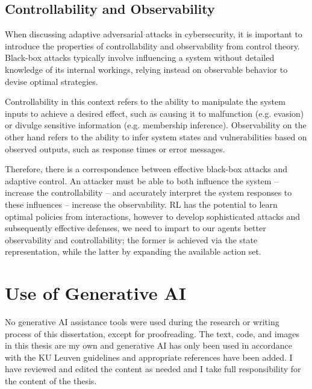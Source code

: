 \subsection{Controllability and Observability}
\label{sec:control}

When discussing adaptive adversarial attacks in cybersecurity, it is important to introduce the properties of controllability and observability from control theory.
Black-box attacks typically involve influencing a system without detailed knowledge of its internal workings, relying instead on observable behavior to devise optimal strategies.

Controllability in this context refers to the ability to manipulate the system inputs to achieve a desired effect, such as causing it to malfunction (e.g. evasion) or divulge sensitive information (e.g. membership inference).
Observability on the other hand refers to the ability to infer system states and vulnerabilities based on observed outputs, such as response times or error messages.

Therefore, there is a correspondence between effective black-box attacks and adaptive control.
An attacker must be able to both influence the system -- increase the controllability -- and accurately interpret the system responses to these influences -- increase the observability.
\gls{RL} has the potential to learn optimal policies from interactions, however to develop sophisticated attacks and subsequently effective defenses, we need to impart to our agents better observability and controllability; the former is achieved via the state representation, while the latter by expanding the available action set.

\section{Use of Generative AI}

No generative AI assistance tools were used during the research or writing process of this dissertation, except for proofreading.
The text, code, and images in this thesis are my own and generative AI has only been used in accordance with the KU Leuven guidelines and appropriate references have been added.
I have reviewed and edited the content as needed and I take full responsibility for the content of the thesis.
